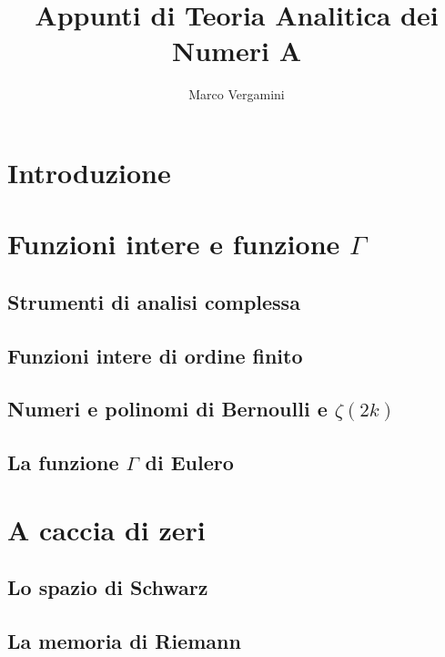 \documentclass{article}
\title{Appunti di Teoria Analitica dei Numeri A}
\date{}
\author{Marco Vergamini}
\begin{document}
\maketitle
\newpage
\tableofcontents
\newpage


\section*{Introduzione}


\newpage

\section{Funzioni intere e funzione $\Gamma$}

\subsection{Strumenti di analisi complessa}


\subsection{Funzioni intere di ordine finito}


\subsection{Numeri e polinomi di Bernoulli e $\zeta(2k)$}


\subsection{La funzione $\Gamma$ di Eulero}


\newpage

\section{A caccia di zeri}

\subsection{Lo spazio di Schwarz}


\subsection{La memoria di Riemann}

\end{document}
